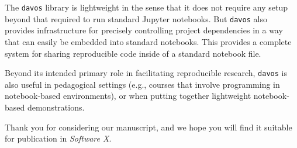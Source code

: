 \documentclass[11pt,stdletter,orderfromtodate,sigleft]{newlfm}
\begin{document}
\begin{newlfm}
 The \texttt{davos} library is lightweight in the sense that it does
 not require any setup beyond that required to run standard Jupyter
 notebooks.  But \texttt{davos} also provides infrastructure for
 precisely controlling project dependencies in a way that can easily
 be embedded into standard notebooks.  This provides a complete system
 for sharing reproducible code inside of a standard notebook file.
  
 Beyond its intended primary role in facilitating reproducible
 research, \texttt{davos} is also useful in pedagogical settings
 (e.g., courses that involve programming in notebook-based
 environments), or when putting together lightweight notebook-based
 demonstrations.

 Thank you for considering our manuscript, and we
 hope you will find it suitable for publication in \textit{Software
   X}.


\end{newlfm}
\end{document}
